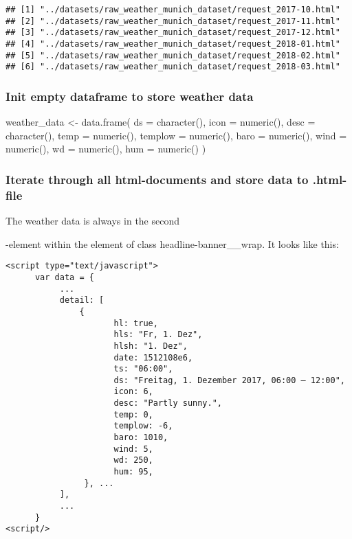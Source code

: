 \documentclass[
]{article}
\newenvironment{Shaded}{\begin{snugshade}}{\end{snugshade}}
\newcommand{\AttributeTok}[1]{\textcolor[rgb]{0.77,0.63,0.00}{#1}}
\newcommand{\FunctionTok}[1]{\textcolor[rgb]{0.00,0.00,0.00}{#1}}
\newcommand{\NormalTok}[1]{#1}
\newcommand{\OtherTok}[1]{\textcolor[rgb]{0.56,0.35,0.01}{#1}}
\begin{document}
\begin{verbatim}
## [1] "../datasets/raw_weather_munich_dataset/request_2017-10.html"
## [2] "../datasets/raw_weather_munich_dataset/request_2017-11.html"
## [3] "../datasets/raw_weather_munich_dataset/request_2017-12.html"
## [4] "../datasets/raw_weather_munich_dataset/request_2018-01.html"
## [5] "../datasets/raw_weather_munich_dataset/request_2018-02.html"
## [6] "../datasets/raw_weather_munich_dataset/request_2018-03.html"
\end{verbatim}

\hypertarget{init-empty-dataframe-to-store-weather-data}{%
\subsubsection{Init empty dataframe to store weather
data}\label{init-empty-dataframe-to-store-weather-data}}

\begin{Shaded}
\begin{Highlighting}[]
\NormalTok{weather\_data }\OtherTok{\textless{}{-}} \FunctionTok{data.frame}\NormalTok{(}
  \AttributeTok{ds =} \FunctionTok{character}\NormalTok{(),}
  \AttributeTok{icon =} \FunctionTok{numeric}\NormalTok{(),}
  \AttributeTok{desc =} \FunctionTok{character}\NormalTok{(),}
  \AttributeTok{temp =} \FunctionTok{numeric}\NormalTok{(),}
  \AttributeTok{templow =} \FunctionTok{numeric}\NormalTok{(),}
  \AttributeTok{baro =} \FunctionTok{numeric}\NormalTok{(),}
  \AttributeTok{wind =} \FunctionTok{numeric}\NormalTok{(),}
  \AttributeTok{wd =} \FunctionTok{numeric}\NormalTok{(),}
  \AttributeTok{hum =} \FunctionTok{numeric}\NormalTok{()}
\NormalTok{)}
\end{Highlighting}
\end{Shaded}

\hypertarget{iterate-through-all-html-documents-and-store-data-to-.html-file}{%
\subsubsection{Iterate through all html-documents and store data to
.html-file}\label{iterate-through-all-html-documents-and-store-data-to-.html-file}}

The weather data is always in the second

-element within the element of class headline-banner\_\_wrap. It looks
like this:

\begin{verbatim}
<script type="text/javascript">
      var data = { 
           ...
           detail: [
               {
                      hl: true,
                      hls: "Fr, 1. Dez",
                      hlsh: "1. Dez",
                      date: 1512108e6,
                      ts: "06:00",
                      ds: "Freitag, 1. Dezember 2017, 06:00 — 12:00",
                      icon: 6,
                      desc: "Partly sunny.",
                      temp: 0,
                      templow: -6,
                      baro: 1010,
                      wind: 5,
                      wd: 250,
                      hum: 95,
                }, ...
           ],
           ...
      }
<script/>
\end{verbatim}
\end{document}
